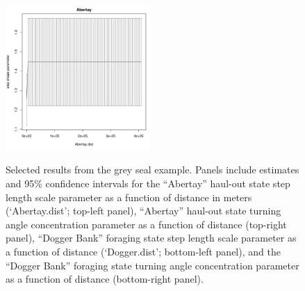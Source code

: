 \documentclass[12pt]{article}
\begin{document}
\begin{figure}[htbp]
  \includegraphics[width=0.49\textwidth,page=13]{plot_greySealResults1}\\
  \caption{Selected results from the grey seal example. Panels include estimates and 95\% confidence intervals for the ``Abertay'' haul-out state step length scale parameter as a function of distance in meters (`Abertay.dist'; top-left panel), ``Abertay'' haul-out state turning angle concentration parameter as a function of distance (top-right panel), ``Dogger Bank'' foraging state step length scale parameter as a function of distance (`Dogger.dist'; bottom-left panel), and the ``Dogger Bank'' foraging state turning angle concentration parameter as a function of distance (bottom-right panel).}
  \label{fig:greySealResults}
\end{figure}
\end{document}
